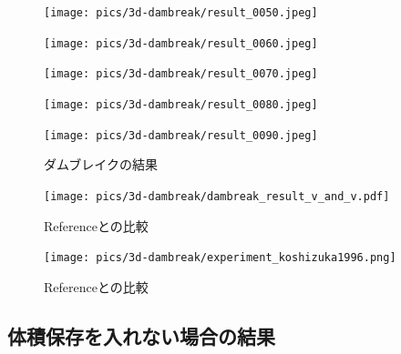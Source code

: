 \begin{figure}[H]
	\centering
	\begin{minipage}[b]{0.19\columnwidth}
	    \centering
	    \texttt{[image: pics/3d-dambreak/result\_0050.jpeg]}
	\end{minipage}
	\begin{minipage}[b]{0.19\columnwidth}
	    \centering
	    \texttt{[image: pics/3d-dambreak/result\_0060.jpeg]}
	\end{minipage}
	\begin{minipage}[b]{0.19\columnwidth}
	    \centering
	    \texttt{[image: pics/3d-dambreak/result\_0070.jpeg]}
	\end{minipage}
	\begin{minipage}[b]{0.19\columnwidth}
	    \centering
	    \texttt{[image: pics/3d-dambreak/result\_0080.jpeg]}
	\end{minipage}
	\begin{minipage}[b]{0.19\columnwidth}
	    \centering
	    \texttt{[image: pics/3d-dambreak/result\_0090.jpeg]}
	\end{minipage}

	\caption{ダムブレイクの結果}
	\label{fig:dambreak-result}
\end{figure}

\begin{figure}[H]
	\centering
	\texttt{[image: pics/3d-dambreak/dambreak\_result\_v\_and\_v.pdf]}
	\caption{Referenceとの比較\cite{Martin1952}}
	\label{fig:3d-dambreak-result-comparison}
\end{figure}

\begin{figure}[H]
	\centering
	\texttt{[image: pics/3d-dambreak/experiment\_koshizuka1996.png]}
	\caption{Referenceとの比較\cite{Koshizuka1996}}
	\label{fig:3d-dambreak-result-picture}
\end{figure}

\subsection{体積保存を入れない場合の結果}


